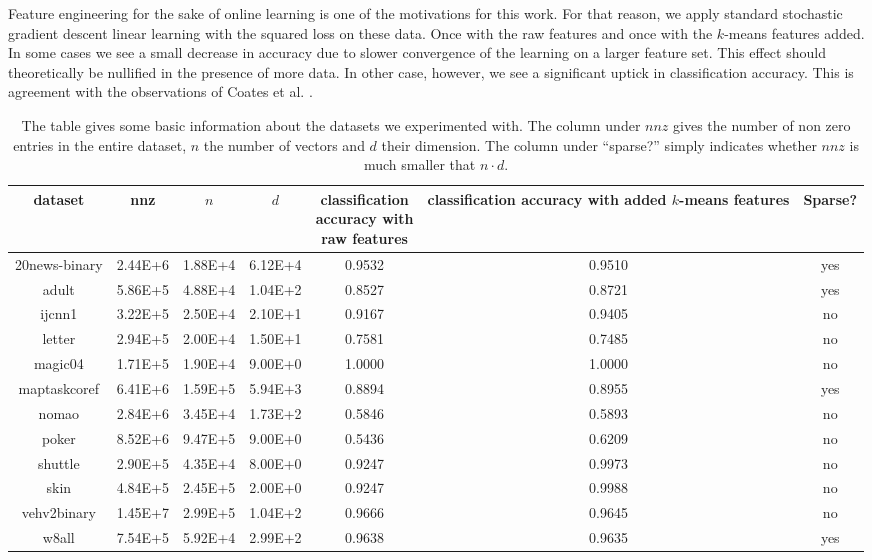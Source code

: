 \documentclass{article}
\begin{document}
Feature engineering for the sake of online learning is one of the motivations for this work.
For that reason, we apply standard stochastic gradient descent linear learning with the squared loss on these data.
Once with the raw features and once with the $k$-means features added. 
In some cases we see a small decrease in accuracy due to slower convergence of the learning on a larger feature set.
This effect should theoretically be nullified in the presence of more data.
In other case, however, we see a significant uptick in classification accuracy. This is agreement with the observations of Coates et al. \cite{CoatesNL11}.

\newcommand{\ttt}[2]{ \parbox{#1pt}{\vspace{0.1cm} \noindent  #2 \vspace{0.1cm}}}
\begin{table}[htdp]
\begin{center}
\begin{tabular}{|c|c|c|c|c|c|c|} \hline
dataset		&	nnz		& $n$	&	$d$	& \ttt{70}{classification \\ accuracy  with  \\ raw features}  & \ttt{90}{classification \\ accuracy with added \\ $k$-means features}	& Sparse?		\\ \hline
20news-binary	&	2.44E+6	&	1.88E+4	&	6.12E+4	& 0.9532	& 0.9510	& yes			\\ \hline %
adult			&	5.86E+5	&	4.88E+4	&	1.04E+2	& 0.8527	& 0.8721	& yes			\\ \hline
ijcnn1		&	3.22E+5	&	2.50E+4	&	2.10E+1	& 0.9167	& 0.9405	& no			\\ \hline %
letter			&	2.94E+5	&	2.00E+4	&	1.50E+1	& 0.7581	& 0.7485	&no			\\ \hline
magic04		&	1.71E+5	&	1.90E+4	&	9.00E+0	& 1.0000	& 1.0000	&no		 	\\ \hline
maptaskcoref	&	6.41E+6	&	1.59E+5	&	5.94E+3	& 0.8894  & 0.8955	&yes		 	\\ \hline
nomao		&	2.84E+6	&	3.45E+4	&	1.73E+2	& 0.5846	& 0.5893	&no		 	\\ \hline
poker		&	8.52E+6	&	9.47E+5	&	9.00E+0	& 0.5436	& 0.6209	&no		  	\\ \hline
shuttle		&	2.90E+5	&	4.35E+4	&	8.00E+0	& 0.9247	& 0.9973	&no		 	\\ \hline
skin			&	4.84E+5	&	2.45E+5	&	2.00E+0	& 0.9247	& 0.9988	&no		 	\\ \hline
vehv2binary	&	1.45E+7	&	2.99E+5	&	1.04E+2	& 0.9666	& 0.9645	&no		 	\\ \hline
w8all			&	7.54E+5	&	5.92E+4	&	2.99E+2	& 0.9638	& 0.9635	&yes		 	\\ \hline
\end{tabular}
\end{center}
\caption{The table gives some basic information about the datasets we experimented with. 
The column under $nnz$ gives the number of non zero entries in the entire dataset, $n$ the number of vectors and $d$ their dimension.
The column under ``sparse?'' simply indicates whether $nnz$ is much smaller that $n\cdot d$.}
\label{table1}
\end{table}%
\end{document}
